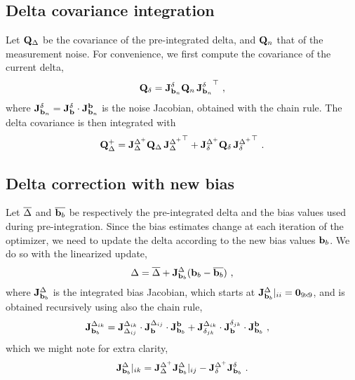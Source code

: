 \subsection{Delta covariance integration}

Let ${\bf Q}_\Delta$ be the covariance of the pre-integrated delta, and ${\bf Q}_n$ that of the measurement noise. For convenience, we first compute the covariance of the current delta,
%
\begin{align}
{\bf Q}_\delta =  {{\bf J}^{\delta}_{{\bf b}_n}}{\bf Q}_n\,{{\bf J}^{\delta}_{{\bf b}_n}}^{\top}
~,
\end{align}
%
where ${{\bf J}^{\delta}_{{\bf b}_n}} = {{\bf J}^{\delta}_{{\bf b}}} \cdot {{\bf J}^{{\bf b}}_{{\bf b}_n}}
$ is the noise Jacobian, obtained with the chain rule.
The delta covariance is then integrated with
%
\begin{align}
{\bf Q}_\Delta^+ = {{\bf J}^{\Delta^+}_{\Delta}}{\bf Q}_\Delta\,{{\bf J}^{\Delta^+}_{\Delta}}^{\top} + {{\bf J}^{\Delta^+}_{\delta}}{\bf Q}_\delta\,{{\bf J}^{\Delta^+}_{\delta}}^{\top}
~.
\end{align}




\subsection{Delta correction with new bias}

Let $\overline{\Delta}$ and $\overline{{\bf b}_b}$ be respectively the pre-integrated delta and the bias values used during pre-integration. Since the bias estimates change at each iteration of the optimizer, we need to update the delta according to the new bias values ${\bf b}_b$. We do so with the linearized update,
%
\begin{align}\label{equ:delta_correction}
\Delta = \overline{\Delta} + {{\bf J}^{\Delta}_{{\bf b}_b}}({\bf b}_b - \overline{{\bf b}_b})
~,
\end{align}
%
where ${{\bf J}^{\Delta}_{{\bf b}_b}}$ is the integrated bias Jacobian, which starts at ${{\bf J}^{\Delta}_{{\bf b}_b}}|_{ii} = {\bf0}_{9\!\times\! 9}$, and is obtained recursively using also the chain rule,
%
\begin{align*}
{{\bf J}^{\Delta_{ik}}_{{\bf b}_b}} 
&= 
{{\bf J}^{\Delta_{ik}}_{\Delta_{ij}}} \cdot {{\bf J}^{\Delta_{ij}}_{{\bf b}}} \cdot {{\bf J}^{{\bf b}}_{{\bf b}_b}} 
+ 
{{\bf J}^{\Delta_{ik}}_{\delta_{jk}}} \cdot {{\bf J}^{\delta_{jk}}_{{\bf b}}} \cdot {{\bf J}^{{\bf b}}_{{\bf b}_b}} 
~,
\end{align*}
%
which we might note for extra clarity,
%
\begin{align}
{{\bf J}^{\Delta}_{{\bf b}_b}}|_{ik} = {{\bf J}^{\Delta^+}_{\Delta}}{{\bf J}^{\Delta}_{{\bf b}_b}}|_{ij} - {{\bf J}^{\Delta^+}_{\delta}}{{\bf J}^{\delta}_{{\bf b}_b}}
~.
\end{align}
%




